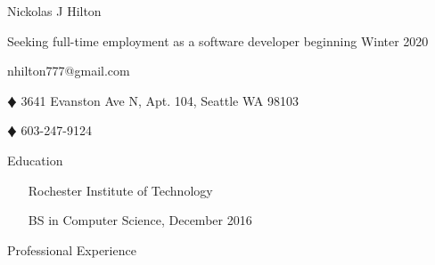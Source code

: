 \documentclass{article}
\newcommand{\lineseparator}[1]{\noindent\makebox[\linewidth]{\rule{\textwidth}{#1}}}
\begin{document}
\begin{minipage}[t]{0.4\textwidth}
  \hspace{-6.5mm}
  {\Huge Nickolas J Hilton }
\end{minipage}
\hspace{-6.5mm}
\begin{minipage}[b]{0.6\textwidth}
  \begin{flushright}
    {\small Seeking full-time employment as a software developer beginning Winter 2020 }
  \end{flushright}
\end{minipage}
\vspace{1mm}
\lineseparator{1.5pt}
\vspace{-2mm}
\begin{center}
  nhilton777@gmail.com 
  \begin{inparaitem}
  \item[$\vardiamond$] 3641 Evanston Ave N, Apt. 104, Seattle WA 98103
  \item[$\vardiamond$] 603-247-9124 
  \end{inparaitem}
\end{center}
\begin{minipage}[t]{1.0\textwidth}
  {\Large Education } 
\end{minipage}
\lineseparator{0.5pt}
\vspace{4mm}
\begin{minipage}[t]{0.5\textwidth}
  \vspace{0.5mm}
  \begin{itemize}[leftmargin=4mm]
    \item[] Rochester Institute of Technology  \vspace{-2mm}  
  \end{itemize}
\end{minipage}
\begin{minipage}[t]{0.5\textwidth}
  \vspace{0.5mm}
  \begin{itemize}[leftmargin=4mm]
    \item[] BS in Computer Science, December 2016 \vspace{-2mm}
  \end{itemize}
\end{minipage}
{\Large Professional Experience } \\
\lineseparator{0.5pt}
\\[4mm]
\end{document}
